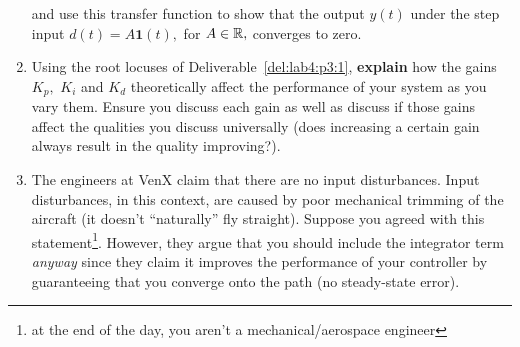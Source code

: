 \begin{deliverable}[label={lab4:report}]
\begin{enumerate}[label={(\arabic*)}]
{\begin{center}
      \end{center}
      and use this transfer function to show that the output \(y(t)\) under the step input \(d(t) = A \mathbf{1}(t),\) for \(A \in \mathbb{R},\) converges to zero.
      \label{lab4:report:q3}
    }
    \item{%
      Using the root locuses of Deliverable~\ref{del:lab4:p3:1}, \textbf{explain} how the gains \(K_p,\) \(K_i\) and \(K_d\) theoretically affect the performance of your system as you vary them.
      Ensure you discuss each gain as well as discuss if those gains affect the qualities you discuss universally (does increasing a certain gain always result in the quality improving?).
      \label{lab4:report:q4}
    }
    \item{%
      The engineers at VenX claim that there are no input disturbances.
      Input disturbances, in this context, are caused by poor mechanical trimming of the aircraft (it doesn't ``naturally'' fly straight).
      Suppose you agreed with this statement\footnote{at the end of the day, you aren't a mechanical/aerospace engineer}.
      However, they argue that you should include the integrator term \emph{anyway} since they claim it improves the performance of your controller by guaranteeing that you converge onto the path (no steady-state error).

}
\end{enumerate}
\end{deliverable}
